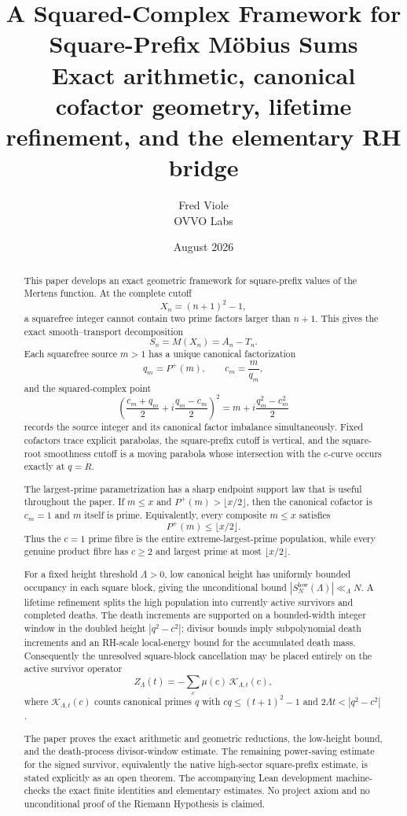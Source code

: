 \documentclass[11pt]{article}
\title{\vspace{-1.5em}\textbf{A Squared-Complex Framework for Square-Prefix M\"obius Sums}\\[0.45em]
\large Exact arithmetic, canonical cofactor geometry, lifetime refinement, and the elementary RH bridge}
\author{Fred Viole\\OVVO Labs}
\date{August 2026}
\theoremstyle{definition}
\newcommand{\Pplus}{P^{+}}
\newcommand{\1}{\mathbf{1}}
\begin{document}
\maketitle

\begin{abstract}
This paper develops an exact geometric framework for square-prefix values of the Mertens function.  At the complete cutoff
\[
 X_n=(n+1)^2-1,
\]
a squarefree integer cannot contain two prime factors larger than $n+1$.  This gives the exact smooth--transport decomposition
\[
 S_n=M(X_n)=A_n-T_n.
\]
Each squarefree source $m>1$ has a unique canonical factorization
\[
 q_m=\Pplus(m),\qquad c_m=\frac{m}{q_m},
\]
and the squared-complex point
\[
 \left(\frac{c_m+q_m}{2}+i\frac{q_m-c_m}{2}\right)^2
 =m+i\frac{q_m^2-c_m^2}{2}
\]
records the source integer and its canonical factor imbalance simultaneously.  Fixed cofactors trace explicit parabolas, the square-prefix cutoff is vertical, and the square-root smoothness cutoff is a moving parabola whose intersection with the $c$-curve occurs exactly at $q=R$.

The largest-prime parametrization has a sharp endpoint support law that is useful throughout the paper.  If $m\le x$ and $\Pplus(m)>\lfloor x/2\rfloor$, then the canonical cofactor is $c_m=1$ and $m$ itself is prime.  Equivalently, every composite $m\le x$ satisfies
\[
 \Pplus(m)\le\lfloor x/2\rfloor.
\]
Thus the $c=1$ prime fibre is the entire extreme-largest-prime population, while every genuine product fibre has $c\ge2$ and largest prime at most $\lfloor x/2\rfloor$.

For a fixed height threshold $\Lambda>0$, low canonical height has uniformly bounded occupancy in each square block, giving the unconditional bound $|S_N^{\mathrm{low}}(\Lambda)|\ll_\Lambda N$.  A lifetime refinement splits the high population into currently active survivors and completed deaths.  The death increments are supported on a bounded-width integer window in the doubled height $|q^2-c^2|$; divisor bounds imply subpolynomial death increments and an RH-scale local-energy bound for the accumulated death mass.  Consequently the unresolved square-block cancellation may be placed entirely on the active survivor operator
\[
 Z_\Lambda(t)=-\sum_c\mu(c)\,\mathcal K_{\Lambda,t}(c),
\]
where $\mathcal K_{\Lambda,t}(c)$ counts canonical primes $q$ with $cq\le (t+1)^2-1$ and $2\Lambda t<|q^2-c^2|$.

The paper proves the exact arithmetic and geometric reductions, the low-height bound, and the death-process divisor-window estimate.  The remaining power-saving estimate for the signed survivor, equivalently the native high-sector square-prefix estimate, is stated explicitly as an open theorem.  The accompanying Lean development machine-checks the exact finite identities and elementary estimates.  No project axiom and no unconditional proof of the Riemann Hypothesis is claimed.
\end{abstract}
\end{document}
